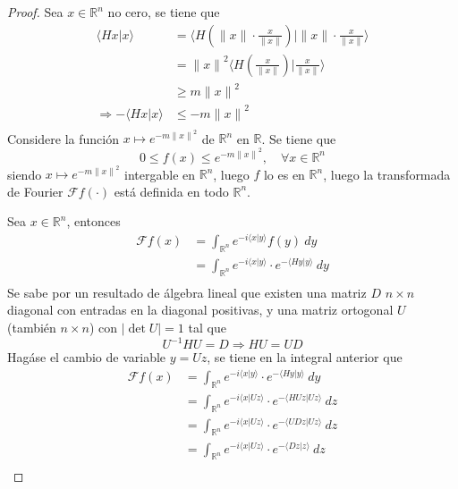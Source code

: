 \documentclass[12pt]{report}
\theoremstyle{largebreak}
\renewcommand{\leq}{\ensuremath{\leqslant}}
\renewcommand{\geq}{\ensuremath{\geqslant}}
\newcommand\abs[1]{\ensuremath{\left|#1\right|}}
\newcommand\norm[1]{\ensuremath{\|#1\|}}
\newcommand\pint[2]{\ensuremath{\langle#1| #2\rangle}}
\newcommand{\fou}[1]{\ensuremath{\mathcal{F}#1}}
\begin{document}
\begin{proof}
        Sea $x\in\mathbb{R}^n$ no cero, se tiene que
        \begin{equation*}
            \begin{split}
                \pint{Hx}{x}
                &=\pint{H\left(\norm{x}\cdot\frac{x}{\norm{x}}\right)}{\norm{x}\cdot\frac{x}{\norm{x}}}\\
                &=\norm{x}^2\pint{H\left(\frac{x}{\norm{x}}\right)}{\frac{x}{\norm{x}}}\\
                &\geq m\norm{x}^2\\
                \Rightarrow -\pint{Hx}{x}&\leq -m\norm{x}^2\\
            \end{split}
        \end{equation*}
        Considere la función $x\mapsto e^{ -m\norm{x}^2}$ de $\mathbb{R}^n$ en $\mathbb{R}$. Se tiene que
        \begin{equation*}
            0\leq f(x)\leq e^{ -m\norm{x}^2},\quad\forall x\in\mathbb{R}^n
        \end{equation*}
        siendo $x\mapsto e^{ -m\norm{x}^2}$ intergable en $\mathbb{R}^n$, luego $f$ lo es en $\mathbb{R}^n$, luego la transformada de Fourier $\fou{f}(\cdot)$ está definida en todo $\mathbb{R}^n$.

        Sea $x\in\mathbb{R}^n$, entonces
        \begin{equation*}
            \begin{split}
                \fou{f}(x)&=\int_{\mathbb{R}^n}e^{ -i\pint{x}{y}}f(y)\:dy\\
                &=\int_{\mathbb{R}^n}e^{ -i\pint{x}{y}}\cdot e^{ -\pint{Hy}{y}}\:dy\\
            \end{split}
        \end{equation*}
        Se sabe por un resultado de álgebra lineal que existen una matriz $D$ $n\times n$ diagonal con entradas en la diagonal positivas, y una matriz ortogonal $U$ (también $n\times n$) con $\abs{\det U}=1$ tal que
        \begin{equation*}
            U^{-1}HU=D\Rightarrow HU=UD
        \end{equation*}
        Hagáse el cambio de variable $y=Uz$, se tiene en la integral anterior que
        \begin{equation*}
            \begin{split}
                \fou{f}(x)&=\int_{\mathbb{R}^n}e^{ -i\pint{x}{y}}\cdot e^{ -\pint{Hy}{y}}\:dy\\
                &=\int_{\mathbb{R}^n}e^{ -i\pint{x}{Uz}}\cdot e^{ -\pint{HUz}{Uz}}\:dz\\
                &=\int_{\mathbb{R}^n}e^{ -i\pint{x}{Uz}}\cdot e^{ -\pint{UDz}{Uz}}\:dz\\
                &=\int_{\mathbb{R}^n}e^{ -i\pint{x}{Uz}}\cdot e^{-\pint{Dz}{z}}\:dz\\
            \end{split}
        \end{equation*}
    \end{proof}
\end{document}
